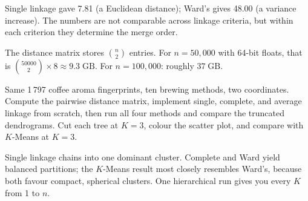 Single linkage gave 7.81 (a Euclidean distance); Ward's gives 48.00 (a variance increase).
The numbers are not comparable across linkage criteria, but within each criterion they determine the merge order.

The distance matrix stores $\binom{n}{2}$ entries.
For $n{=}50{,}000$ with 64-bit floats, that is $\binom{50000}{2} \times 8 \approx 9.3\;\mathrm{GB}$.
For $n{=}100{,}000$: roughly $37\;\mathrm{GB}$.


\vspace{2.5em}



Same 1\,797 coffee aroma fingerprints, ten brewing methods, two coordinates.
Compute the pairwise distance matrix, implement single, complete, and average 
linkage from scratch, then run all four methods and compare 
the truncated dendrograms.
Cut each tree at $K{=}3$, colour the scatter plot, and compare with $K$-Means at $K{=}3$.

Single linkage chains into one dominant cluster.
Complete and Ward yield balanced partitions; the $K$-Means result most closely 
resembles Ward's, because both favour compact, spherical clusters.
One hierarchical run gives you every $K$ from 1 to $n$.



\vspace{2.5em}




